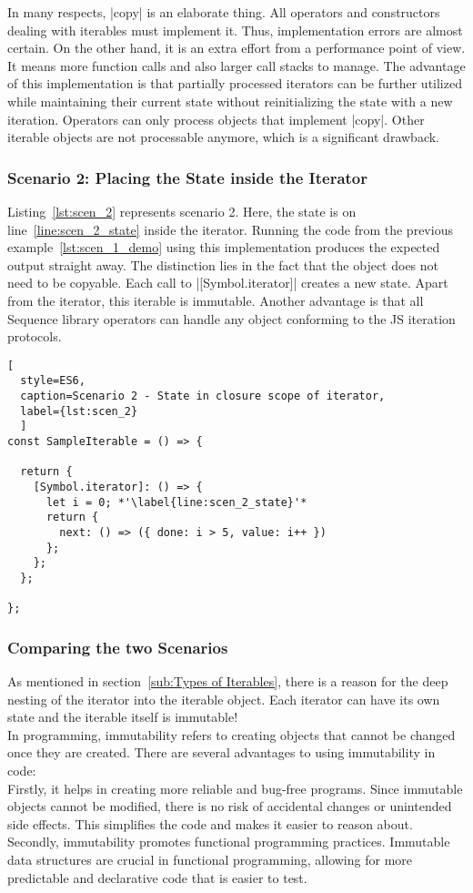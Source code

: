 In many respects, |copy| is an elaborate thing. All operators and constructors 
dealing with iterables must implement it. Thus, implementation errors are 
almost certain. On the other hand, it is an extra effort from a performance point 
of view. It means more function calls and also larger call stacks to manage.
The advantage of this implementation is that partially processed iterators can
be further utilized while maintaining their current state without
reinitializing the state with a new iteration.
Operators can only process objects that implement |copy|.
Other iterable objects are not processable anymore, which is a significant
drawback.

\subsubsection{Scenario 2: Placing the State inside the Iterator}
\label{subsub:Scenario 2}
Listing~\ref{lst:scen_2} represents scenario 2. Here, the state is on
line~\ref{line:scen_2_state} inside the iterator. Running the code from the
previous example~\ref{lst:scen_1_demo} using this implementation produces the
expected output straight away. The distinction lies in the fact that the object
does not need to be copyable. Each call to |[Symbol.iterator]| creates a new
state. Apart from the iterator, this iterable is immutable. Another advantage
is that all Sequence library operators can handle any object conforming to the
JS iteration protocols.

\begin{lstlisting}[
  style=ES6, 
  caption=Scenario 2 - State in closure scope of iterator,
  label={lst:scen_2}
  ]
const SampleIterable = () => {

  return {
    [Symbol.iterator]: () => {
      let i = 0; *'\label{line:scen_2_state}'*
      return {
        next: () => ({ done: i > 5, value: i++ })
      };
    };
  };

};
\end{lstlisting}


\subsubsection{Comparing the two Scenarios}
\label{subsub:Comparing the Two Scenarios}
As mentioned in section~\ref{sub:Types of Iterables}, there is a reason for 
the deep nesting of the iterator into the iterable object. 
Each iterator can have its own state and the iterable itself is immutable! \\
In programming, immutability refers to creating objects that cannot be changed
once they are created. There are several advantages to using immutability in
code: \\
Firstly, it helps in creating more reliable and bug-free programs. Since
immutable objects cannot be modified, there is no risk of accidental changes or
unintended side effects. This simplifies the code and makes it easier to reason
about. \\
Secondly, immutability promotes functional programming practices. Immutable
data structures are crucial in functional programming, allowing for more
predictable and declarative code that is easier to test.


